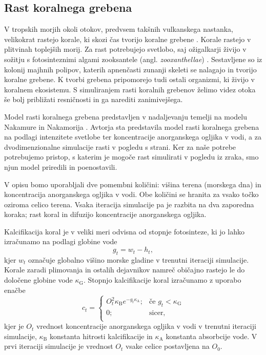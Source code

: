 \documentclass[9pt]{pnas-new}
\newcommand{\const}[1]{{\ensuremath{\kappa_\mathrm{#1}}}}
\begin{document}
\subsection*{Rast koralnega grebena}
V tropskih morjih okoli otokov, predvsem takšnih vulkanskega nastanka, velikokrat rastejo korale, ki skozi čas tvorijo koralne grebene \cite{oxford_encly_1995}. Korale rastejo v plitvinah toplejših morij. Za rast potrebujejo svetlobo, saj ožigalkarji živijo v sožitju s fotosinteznimi algami zooksantele (angl. \emph{zooxanthellae}) \cite{oxford_encly_1995}. Sestavljene so iz kolonij majhnih polipov, katerih apnenčasti zunanji skeleti se nalagajo in tvorijo koralne grebene. K tvorbi grebena pripomorejo tudi ostali organizmi, ki živijo v koralnem ekosistemu. S simuliranjem rasti koralnih grebenov želimo videz otoka še bolj približati resničnosti in ga narediti zanimivejšega.

Model rasti koralnega grebena predstavljen v nadaljevanju temelji na modelu Nakamure in Nakamorija \cite{nakamura_reef_simulation_11}. Avtorja sta predstavila model rasti koralnega grebena na podlagi intenzitete svetlobe ter koncentracije anorganskega ogljika v vodi, a za dvodimenzionalne simulacije rasti v pogledu s strani. Ker za naše potrebe potrebujemo pristop, s katerim je mogoče rast simulirati v pogledu iz zraka, smo njun model priredili in poenostavili.

V opisu bomo uporabljali dve pomembni količini: višina terena (morskega dna) in koncentracija anorganskega ogljika v vodi. Obe količini se hranita za vsako točko oziroma celico terena. Vsaka iteracija simulacije pa je razbita na dva zaporedna koraka; rast koral in difuzijo koncentracije anorganskega ogljika. 

Kalcifikacija koral je v veliki meri odvisna od stopnje fotosinteze, ki jo lahko izračunamo na podlagi globine vode
\begin{equation} \label{eq:depth}
g_t = w_t - h_t,
\end{equation}
kjer $w_t$ označuje globalno višino morske gladine v trenutni iteraciji simulacije. Korale zaradi plimovanja in ostalih dejavnikov namreč običajno rastejo le do določene globine vode $\const{G}$. Stopnjo kalcifikacije koral izračunamo z uporabo enačbe
\begin{equation} \label{eq:calcification_rate}
c_t=
\begin{cases}
O_t^2 \kappa_\mathrm{B} e^{-g_t\const{A}}; & \text{če } g_t < \const{G} \\
0; & \text{sicer,} \\
\end{cases}
\end{equation}
kjer je $O_t$ vrednost koncentracije anorganskega ogljika v vodi v trenutni iteraciji simulacije, $\const{B}$ konstanta hitrosti kalcifikacije in $\const{A}$ konstanta absorbcije vode. V prvi iteraciji simulacije je vrednost $O_t$ vsake celice postavljena na $O_0$.
\end{document}
